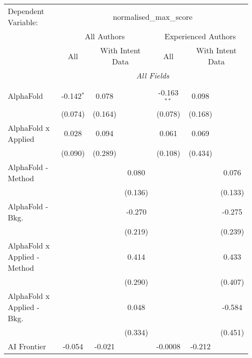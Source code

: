 \begingroup
\centering
\begin{tabular}{lcccccc}
   \tabularnewline \midrule \midrule
   Dependent Variable: & \multicolumn{6}{c}{normalised\_max\_score}\\
 & \multicolumn{3}{c}{All Authors} & \multicolumn{3}{c}{Experienced Authors} \\
\cmidrule(lr){2-4} \cmidrule(lr){5-7}
 & \multicolumn{1}{c}{All} & \multicolumn{2}{c}{With Intent Data} & \multicolumn{1}{c}{All} & \multicolumn{2}{c}{With Intent Data} \\
\cmidrule(lr){2-2} \cmidrule(lr){3-4} \cmidrule(lr){5-5} \cmidrule(lr){6-7}
 & \multicolumn{6}{c}{\textit{All Fields}} \\ \\
   AlphaFold                      & -0.142$^{*}$ & 0.078   &         & -0.163$^{**}$ & 0.098   &   \\   
                                  & (0.074)      & (0.164) &         & (0.078)       & (0.168) &   \\   
   AlphaFold x Applied            & 0.028        & 0.094   &         & 0.061         & 0.069   &   \\   
                                  & (0.090)      & (0.289) &         & (0.108)       & (0.434) &   \\   
   AlphaFold - Method             &              &         & 0.080   &               &         & 0.076\\   
                                  &              &         & (0.136) &               &         & (0.133)\\   
   AlphaFold - Bkg.               &              &         & -0.270  &               &         & -0.275\\   
                                  &              &         & (0.219) &               &         & (0.239)\\   
   AlphaFold x Applied - Method   &              &         & 0.414   &               &         & 0.433\\   
                                  &              &         & (0.290) &               &         & (0.407)\\   
   AlphaFold x Applied - Bkg.     &              &         & 0.048   &               &         & -0.584\\   
                                  &              &         & (0.334) &               &         & (0.451)\\   
   AI Frontier                    & -0.054       & -0.021  &         & -0.0008       & -0.212  &   \\   

\end{tabular}
